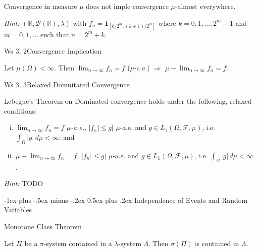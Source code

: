 \documentclass[10pt,landscape]{article}
\makeatletter
\renewcommand{\leq}{\leqslant}
\newcommand{\Hint}{\textit{Hint: }}
\newcommand{\Indicator}[1]{\mathbf{1}_{#1}}
\newcommand{\CalF}{\mathcal{F}}
\renewcommand{\section}{\@startsection{section}{1}{0mm}%
                                {-1ex plus -.5ex minus -.2ex}%
                                {0.5ex plus .2ex}%
                                {\normalfont\large\bfseries}}
\makeatother
\begin{document}
\begin{multicols}{3}
\begin{exercise}{5.5}{}

    Convergence in measure $\mu$ does not imple convergence $\mu$-almost everywhere.

    \Hint $(\mathbb{R}, \mathcal{B}(\mathbb{R}), \lambda)$ with $f_n = \Indicator{[k/2^m, (k+1)/2^m]}$ where $k = 0,1,\hdots,2^m - 1$ and $m=0,1,\hdots$ such that $n = 2^m + k$.

\end{exercise}

\begin{exercise}{Ws 3, 2}{Convergence Implication}

    Let $\mu(\Omega) < \infty$. Then $\lim_{n \to \infty} f_n = f$ ($\mu$-a.e.) $\Rightarrow$ $\mu-\lim_{n \to \infty} f_n = f$.

\end{exercise}

\begin{exercise}{Ws 3, 3}{Relaxed Domnitated Convergence}

    Lebegue's Theorem on Dominated convergence holds under the following, relaxed conditions:

        \begin{enumerate}[(i)]
            \item $\lim_{n \to \infty} f_n = f$ \emph{$\mu$-a.e.},  $|f_n| \leq g|$ $\mu$-a.e. and $g \in L_1(\Omega, \CalF, \mu)$, i.e. $\int_{\Omega} |g| \, d\mu < \infty$; and
            \item $\mu-\lim_{n \to \infty} f_n = f$,  $|f_n| \leq g|$ $\mu$-a.e. and $g \in L_1(\Omega, \CalF, \mu)$, i.e. $\int_{\Omega} |g| \, d\mu < \infty$.
        \end{enumerate}

    \Hint TODO

\end{exercise}


\section{Independence of Events and Random Variables}

\begin{theorem}{6.3}{Monotone Class Theorem}

    Let $\Pi$ be a $\pi$-system contained in a $\lambda$-system $\Lambda$. Then $\sigma(\Pi)$ is contained in $\Lambda$.


\end{theorem}
\end{multicols}
\end{document}
